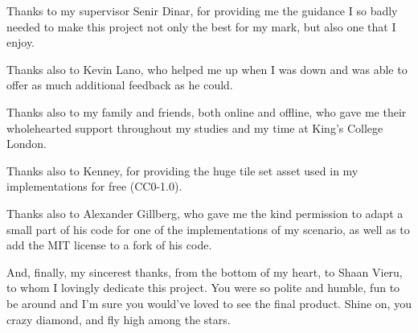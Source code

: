 
Thanks to my supervisor Senir Dinar, for providing me the guidance I so badly needed to make this project not only the best for my mark, but also one that I enjoy.

Thanks also to Kevin Lano, who helped me up when I was down and was able to offer as much additional feedback as he could.

Thanks also to my family and friends, both online and offline, who gave me their wholehearted support throughout my studies and my time at King's College London.

Thanks also to Kenney, for providing the huge tile set asset used in my implementations for free (CC0-1.0).

Thanks also to Alexander Gillberg, who gave me the kind permission to adapt a small part of his code for one of the implementations of my scenario, as well as to add the MIT license to a fork of his code.

And, finally, my sincerest thanks, from the bottom of my heart, to Shaan Vieru, to whom I lovingly dedicate this project. You were so polite and humble, fun to be around and I'm sure you would've loved to see the final product. Shine on, you crazy diamond, and fly high among the stars.